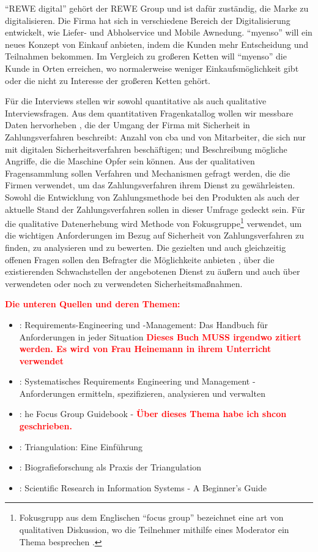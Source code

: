 ``REWE digital'' gehört der REWE Group und ist dafür zuständig, die Marke zu digitalisieren. Die Firma hat sich
in verschiedene Bereich der Digitalisierung entwickelt, wie Liefer- und Abholservice und Mobile Awnedung. ``myenso'' 
will ein neues Konzept von Einkauf anbieten, indem die Kunden mehr Entscheidung und Teilnahmen bekommen. Im Vergleich 
zu großeren Ketten will ``myenso'' die Kunde in Orten erreichen, wo normalerweise weniger Einkaufsmöglichkeit gibt
oder die nicht zu Interesse der großeren Ketten gehört.


Für die Interviews stellen wir sowohl quantitative als auch qualitative Interviewsfragen. Aus dem quantitativen Fragenkatallog
wollen wir messbare Daten hervorheben \cite{refbook:SRJR}, die der Umgang der Firma mit Sicherheit in Zahlungsverfahren
beschreibt: Anzahl von \acrfull{cba} und von Mitarbeiter, die sich nur mit digitalen Sicherheitsverfahren beschäftigen;
und Beschreibung mögliche Angriffe, die die Maschine Opfer sein können. Aus der qualitativen Fragensammlung sollen Verfahren 
und Mechanismen gefragt werden, die die Firmen verwendet, um das Zahlungsverfahren ihrem Dienst zu gewährleisten. 
Sowohl die Entwicklung von Zahlungsmethode bei den Produkten als auch der aktuelle Stand der Zahlungsverfahren
sollen in dieser Umfrage gedeckt sein. Für die qualitative Datenerhebung wird Methode von Fokusgruppe\footnote{Fokusgrupp
aus dem Englischen ``focus group'' bezeichnet eine art von qualitativen Diskussion, wo die Teilnehmer mithilfe eines 
Moderator ein Thema besprechen \cite{refbook:APGF}.} verwendet, um die wichtigen Anforderungen im Bezug auf Sicherheit von 
Zahlungsverfahren zu finden, zu analysieren und zu bewerten. Die gezielten und auch gleichzeitig offenen Fragen sollen den
Befragter die Möglichkeite anbieten \cite{refbook:EFAF}, über die existierenden Schwachstellen der angebotenen Dienst zu äußern 
und auch über verwendeten oder noch zu verwendeten Sicherheitsmaßnahmen.

\textcolor{red}{\textbf{Die unteren Quellen und deren Themen:}}
\begin{itemize}
  \item \cite{refbook:RECR}: Requirements-Engineering und -Management: 
  Das Handbuch für Anforderungen in jeder Situation \textcolor{red}{\textbf{Dieses Buch MUSS irgendwo
  zitiert werden. Es wird von Frau Heinemann in ihrem Unterricht verwendet }}
  \item \cite{refbook:CESR}: Systematisches Requirements Engineering und Management 
  - Anforderungen ermitteln,   spezifizieren, analysieren und verwalten
  \item \cite{refbook:DMFG}: he Focus Group Guidebook - 
  \textcolor{red}{\textbf{Über dieses Thema habe ich shcon geschrieben.}}
  \item \cite{refbook:TEUF}: Triangulation: Eine Einführung
  \item \cite{refbook:BPAG}: Biografieforschung als Praxis der Triangulation
  \item \cite{refbook:RMJL}: Scientific Research in Information Systems - A Beginner's Guide
\end{itemize}


